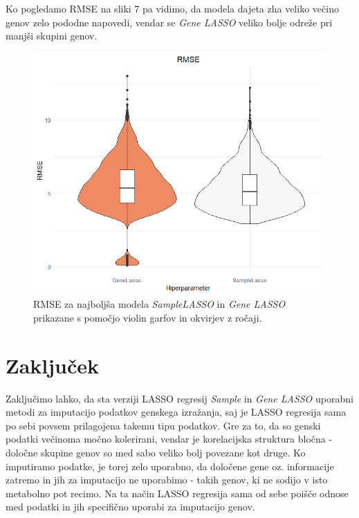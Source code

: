 \documentclass[onecolumn]{report}
\begin{document}
Ko pogledamo RMSE na sliki 7 pa vidimo, da modela dajeta zha veliko večino genov zelo pododne napovedi, vendar se \emph{Gene LASSO} veliko bolje odreže pri manjši skupini genov.

\begin{figure}[!htb]
	\centering
	\includegraphics[width=1\linewidth]{fig/best_rmse.png}
	\caption{RMSE za najboljša modela \emph{SampleLASSO} in \emph{Gene LASSO} prikazane s pomočjo violin garfov in okvirjev z ročaji.}
	\label{fig:vqvae}
\end{figure}

\section{Zaključek}

Zaključimo lahko, da sta verziji LASSO regresij \emph{Sample} in \emph{Gene LASSO} uporabni metodi za imputacijo podatkov genskega izražanja, saj je LASSO regresija sama po sebi povsem prilagojena takemu tipu podatkov. Gre za to, da so genski podatki večinoma močno kolerirani, vendar je korelacijska struktura bločna - določne skupine genov so med sabo veliko bolj povezane kot druge. Ko imputiramo podatke, je torej zelo uporabno, da določene gene oz. informacije zatremo in jih za imputacijo ne uporabimo - takih genov, ki ne sodijo v isto metabolno pot recimo. Na ta način LASSO regresija sama od sebe poišče odnose med podatki in jih specifično uporabi za imputacijo genov.
\end{document}
